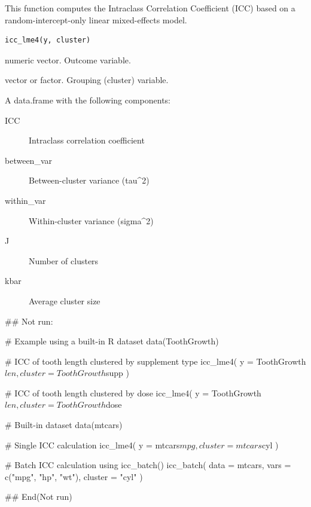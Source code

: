 \documentclass[a4paper]{book}
\begin{document}
%
\begin{Description}
This function computes the Intraclass Correlation Coefficient (ICC)
based on a random-intercept-only linear mixed-effects model.
\end{Description}
%
\begin{Usage}
\begin{verbatim}
icc_lme4(y, cluster)
\end{verbatim}
\end{Usage}
%
\begin{Arguments}
\begin{ldescription}
\item[\code{y}] numeric vector. Outcome variable.

\item[\code{cluster}] vector or factor. Grouping (cluster) variable.
\end{ldescription}
\end{Arguments}
%
\begin{Value}
A data.frame with the following components:
\begin{description}

\item[ICC] Intraclass correlation coefficient
\item[between\_var] Between-cluster variance (tau\textasciicircum{}2)
\item[within\_var] Within-cluster variance (sigma\textasciicircum{}2)
\item[J] Number of clusters
\item[kbar] Average cluster size

\end{description}

\end{Value}
%
\begin{Examples}
\begin{ExampleCode}
\#\# Not run: 

# Example using a built-in R dataset
data(ToothGrowth)

# ICC of tooth length clustered by supplement type
icc_lme4(
  y = ToothGrowth$len,
  cluster = ToothGrowth$supp
)

# ICC of tooth length clustered by dose
icc_lme4(
  y = ToothGrowth$len,
  cluster = ToothGrowth$dose


# Built-in dataset
data(mtcars)

# Single ICC calculation
icc_lme4(
  y = mtcars$mpg,
  cluster = mtcars$cyl
)

# Batch ICC calculation using icc_batch()
icc_batch(
  data = mtcars,
  vars = c("mpg", "hp", "wt"),
  cluster = "cyl"
)

## End(Not run)
\end{ExampleCode}
\end{Examples}
\end{document}
